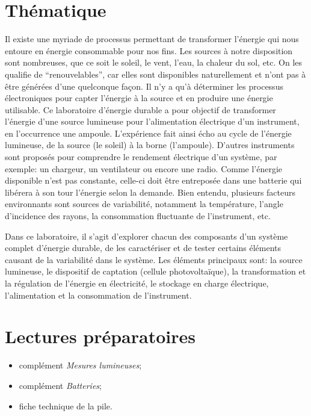 \documentclass[canadien,12pt,oneside,letterpaper]{article}
\begin{document}
\section{Thématique}\label{sec:thematique}
\vspace{-2ex}
Il existe une myriade de processus permettant de transformer l’énergie qui nous entoure en énergie consommable pour nos fins. Les sources à notre disposition sont nombreuses, que ce soit le soleil, le vent, l’eau, la chaleur du sol, etc. On les qualifie de “renouvelables”, car elles sont disponibles naturellement et n’ont pas à être générées d’une quelconque façon. Il n’y a qu’à déterminer les processus électroniques pour capter l'énergie à la source et en produire une énergie utilisable. Ce laboratoire d'énergie durable a pour objectif de transformer l'énergie d'une source lumineuse pour l'alimentation électrique d'un instrument, en l'occurrence une ampoule. L'expérience fait ainsi écho au cycle de l'énergie lumineuse, de la source (le soleil) à la borne (l'ampoule). D'autres instruments sont proposés pour comprendre le rendement électrique d'un système, par exemple: un chargeur, un ventilateur ou encore une radio. Comme l'énergie disponible n'est pas constante, celle-ci doit être entreposée dans une batterie qui libérera à son tour l'énergie selon la demande. Bien entendu, plusieurs facteurs environnants sont sources de variabilité, notamment la température, l'angle d'incidence des rayons, la consommation fluctuante de l'instrument, etc.

Dans ce laboratoire, il s'agit d'explorer chacun des composants d'un système complet d'énergie durable, de les caractériser et de tester certains éléments causant de la variabilité dans le système. Les éléments principaux sont: la source lumineuse, le dispositif de captation (cellule photovoltaïque), la transformation et la régulation de l'énergie en électricité, le stockage en charge électrique, l'alimentation et la consommation de l'instrument.

\section{Lectures préparatoires}\label{sec:lectures preparatoires}
\vspace{-2ex}
\begin{itemize}
\item complément \textit{Mesures lumineuses};
\item complément \textit{Batteries};
\item fiche technique de la pile.
\end{itemize}
\end{document}
